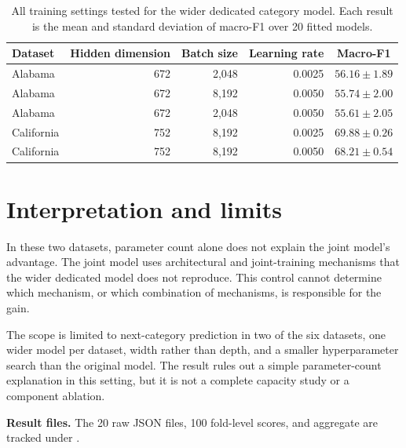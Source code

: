 \begin{table}[H]
    \centering
    \caption{All training settings tested for the wider dedicated category model.
    Each result is the mean and standard deviation of macro-F1 over 20 fitted
    models.}
    \label{tab:apx-parameter-arms}
    \begin{tabular}{lrrrc}
        \toprule
        Dataset & Hidden dimension & Batch size & Learning rate & Macro-F1 \\
        \midrule
        Alabama    & 672 & 2,048 & 0.0025 & $56.16 \pm 1.89$ \\
        Alabama    & 672 & 8,192 & 0.0050 & $55.74 \pm 2.00$ \\
        Alabama    & 672 & 2,048 & 0.0050 & $55.61 \pm 2.05$ \\
        California & 752 & 8,192 & 0.0025 & $69.88 \pm 0.26$ \\
        California & 752 & 8,192 & 0.0050 & $68.21 \pm 0.54$ \\
        \bottomrule
    \end{tabular}
\end{table}

\section{Interpretation and limits}
\label{sec:apx-parameter-result}

In these two datasets, parameter count alone does not explain the joint model's
advantage. The joint model uses architectural and joint-training mechanisms that
the wider dedicated model does not reproduce. This control cannot determine which
mechanism, or which combination of mechanisms, is responsible for the gain.

The scope is limited to next-category prediction in two of the six datasets, one
wider model per dataset, width rather than depth, and a smaller hyperparameter
search than the original model. The result rules out a simple parameter-count
explanation in this setting, but it is not a complete capacity study or a component
ablation.

\noindent\textbf{Result files.} The 20 raw JSON files, 100 fold-level scores, and
aggregate  are tracked under
.

